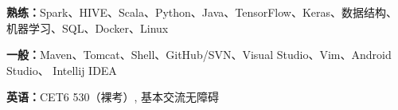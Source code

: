 \vspace{-15pt}


\begin{cventries}
\vspace{-10pt}
  \cventry
    {} %
    {} %
    {} %
    {} %
    {
    	\begin{cvitems} %
	\vspace{-5pt}
	  \item {\textbf{熟练：}Spark、HIVE、Scala、Python、Java、TensorFlow、Keras、数据结构、机器学习、SQL、Docker、Linux}
          \item {\textbf{一般：}Maven、Tomcat、Shell、GitHub/SVN、Visual Studio、Vim、Android Studio、 Intellij IDEA}
          \item {\textbf{英语：}CET6  530（裸考）, 基本交流无障碍}
        \end{cvitems} 
    }

    

\end{cventries}
